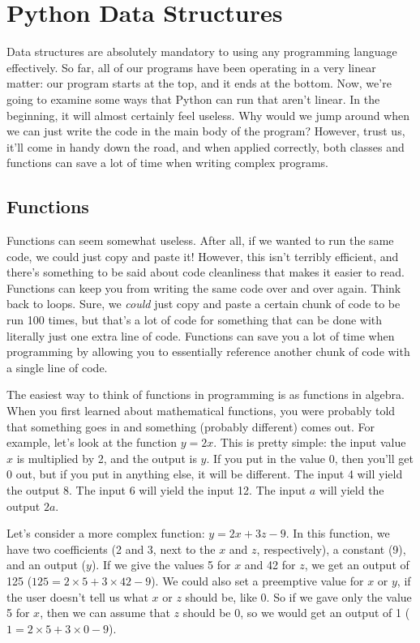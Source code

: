 \chapter{Python Data Structures}
Data structures are absolutely mandatory to using any programming language effectively. So far, all of our programs have been operating in a very linear matter: our program starts at the top, and it ends at the bottom. Now, we're going to examine some ways that Python can run that aren't linear. In the beginning, it will almost certainly feel useless. Why would we jump around when we can just write the code in the main body of the program? However, trust us, it'll come in handy down the road, and when applied correctly, both classes and functions can save a lot of time when writing complex programs.\par
\section{Functions}
Functions can seem somewhat useless. After all, if we wanted to run the same code, we could just copy and paste it! However, this isn't terribly efficient, and there's something to be said about code cleanliness that makes it easier to read. Functions can keep you from writing the same code over and over again. Think back to loops. Sure, we \textit{could} just copy and paste a certain chunk of code to be run 100 times, but that's a lot of code for something that can be done with literally just one extra line of code. Functions can save you a lot of time when programming by allowing you to essentially reference another chunk of code with a single line of code.\par
The easiest way to think of functions in programming is as functions in algebra. When you first learned about mathematical functions, you were probably told that something goes in and something (probably different) comes out. For example, let's look at the function $y = 2x$. This is pretty simple: the input value $x$ is multiplied by 2, and the output is $y$. If you put in the value 0, then you'll get 0 out, but if you put in anything else, it will be different. The input 4 will yield the output 8. The input 6 will yield the input 12. The input $a$ will yield the output $2a$.\par
Let's consider a more complex function: $y = 2x + 3z - 9$. In this function, we have two coefficients (2 and 3, next to the $x$ and $z$, respectively), a constant (9), and an output ($y$). If we give the values 5 for $x$ and 42 for $z$, we get an output of 125 ($125 = 2 \times 5 + 3 \times 42 - 9$). We could also set a preemptive value for $x$ or $y$, if the user doesn't tell us what $x$ or $z$ should be, like 0. So if we gave only the value 5 for $x$, then we can assume that $z$ should be 0, so we would get an output of 1 ($1 = 2 \times 5 + 3 \times 0 - 9$).\par
